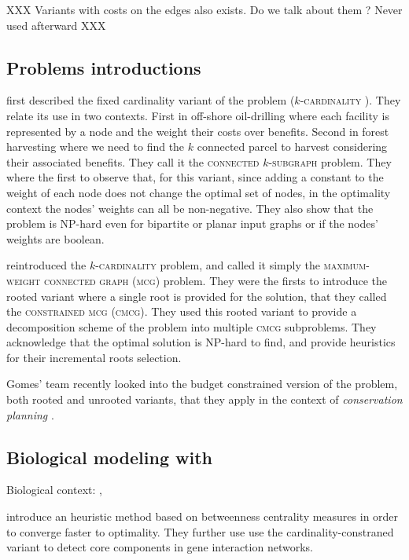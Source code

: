 	XXX Variants with costs on the edges also exists. Do we talk about them ? Never used afterward XXX

	\subsection{Problems introductions}

		\Textcite{hochbaum1994node} first described the fixed cardinality variant of the problem (\textsc{$k$-cardinality \mwcs{}}).
		They relate its use in two contexts.
		First in off-shore oil-drilling where each facility is represented by a node and the weight their costs over benefits.
		Second in forest harvesting where we need to find the $k$ connected parcel to harvest considering their associated benefits.
		They call it the \textsc{connected $k$-subgraph} problem.
		They where the first to observe that, for this variant, since adding a constant to the weight of each node does not change the optimal set of nodes, in the optimality context the nodes' weights can all be non-negative.
		They also show that the problem is NP-hard even for bipartite or planar input graphs or if the nodes' weights are boolean.

		\Textcite{lee1998decomposition} reintroduced the \textsc{$k$-cardinality \mwcs{}} problem, and called it simply the \textsc{maximum-weight connected graph} (\textsc{mcg}) problem.
		They were the firsts to introduce the rooted variant where a single root is provided for the solution, that they called the \textsc{constrained mcg} (\textsc{cmcg}).
		They used this rooted variant to provide a decomposition scheme of the \mwcs{} problem into multiple \textsc{cmcg} subproblems.
		They acknowledge that the optimal solution is NP-hard to find, and provide heuristics for their incremental roots selection.

		Gomes' team recently looked into the budget constrained version of the problem, both rooted and unrooted variants, that they apply in the context of \emph{conservation planning} \parencites{conrad2007connections}{gomes2008connections}{dilkina2010solving}.


	\subsection{Biological modeling with \mwcs{}}
	\label{subsec:mwcsbiouses}

		Biological context: \cite{dittrich2008identifying}, \cite{backes2012integer}

		\cite{yamamoto2009better} introduce an heuristic method based on betweenness centrality measures in order to converge faster to optimality.
		They further use use the cardinality-constraned \mwcs{} variant to detect core components in gene interaction networks.

